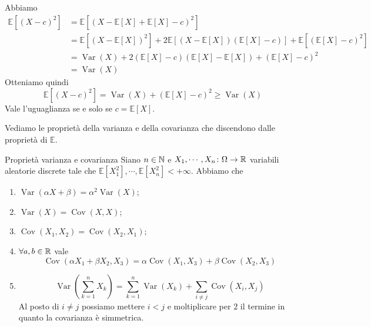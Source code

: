\documentclass[a4paper]{article}
\begin{document}
\begin{snippetproof}{}
    Abbiamo
    \begin{align*}
        \mathbb E[(X-c)^2]
        &= \mathbb E[(X- \mathbb E[X] + \mathbb E[X] - c)^2] \\
        &= \mathbb E[(X - \mathbb E[X])^2] + 2\mathbb E[(X - \mathbb E[X])(\mathbb E[X]-c)]
        + \mathbb E[(\mathbb E[X] - c)^2] \\
        &= \operatorname{Var}(X)
        + 2(\mathbb E[X] - c)\left(
            \mathbb E[X] - \mathbb E[X]
        \right) + (\mathbb E[X] - c)^2 \\
        &= \operatorname{Var}(X)
    \end{align*}
    Otteniamo quindi \[
        \mathbb E[(X-c)^2] =
        \operatorname{Var}(X)
        + (\mathbb E[X] - c)^2 \geq \operatorname{Var}(X)
    \]
    Vale l'uguaglianza se e solo se \(c = \mathbb E[X]\).
\end{snippetproof}

Vediamo le proprietà della varianza e della covarianza che discendono dalle proprietà di \(\mathbb E\).

\begin{snippetproposition}{Proprietà varianza e covarianza}
    Siano \(n \in \mathbb{N}\) e \(X_1, \cdots, X_n \colon \Omega \to \mathbb{R}\)
    variabili aleatorie discrete
    tale che \(\mathbb E[X_1^2], \cdots, \mathbb E[X_n^2] < + \infty\).
    Abbiamo che
    \begin{enumerate}
        \item \(\operatorname{Var}(\alpha X + \beta) = \alpha^2 \operatorname{Var}(X)\);
        \item \(\operatorname{Var}(X) = \operatorname{Cov}(X,X)\);
        \item \(\operatorname{Cov}(X_1, X_2) = \operatorname{Cov}(X_2, X_1)\);
        \item \(\forall a,b \in \mathbb{R}\) vale
            \[
                \operatorname{Cov}(\alpha X_1 + \beta X_2, X_3)
                = \alpha \operatorname{Cov}(X_1, X_3)
                + \beta \operatorname{Cov}(X_2, X_3)
            \]
        \item \[
                \operatorname{Var}\left(
                    \sum_{k=1}^n X_k
                \right)
                = \sum_{k=1}^n \operatorname{Var}(X_k)
                + \sum_{i\neq j} \operatorname{Cov}(X_i, X_j)
            \]
            Al posto di \(i\neq j\) possiamo mettere \(i < j\) e moltiplicare per \(2\)
            il termine in quanto la covarianza è simmetrica.
    \end{enumerate}
\end{snippetproposition}
\end{document}

